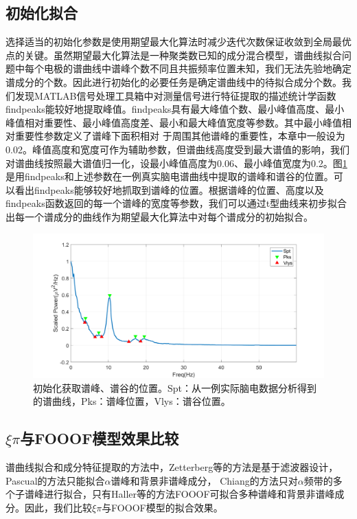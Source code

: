 \subsection{初始化拟合}
选择适当的初始化参数是使用期望最大化算法时减少迭代次数保证收敛到全局最优点的关键。虽然期望最大化算法是一种聚类数已知的成分混合模型，谱曲线拟合问题中每个电极的谱曲线中谱峰个数不同且共振频率位置未知，我们无法先验地确定谱成分的个数。因此进行初始化的必要任务是确定谱曲线中的待拟合成分个数。我们发现MATLAB信号处理工具箱中对测量信号进行特征提取的描述统计学函数findpeaks能较好地提取峰值。findpeaks具有最大峰值个数、最小峰值高度、最小峰值相对重要性、最小峰值高度差、最小和最大峰值宽度等参数。其中最小峰值相对重要性参数定义了谱峰下面积相对
于周围其他谱峰的重要性，本章中一般设为0.02。峰值高度和宽度可作为辅助参数，但谱曲线高度受到最大谱值的影响，我们对谱曲线按照最大谱值归一化，设最小峰值高度为0.06、最小峰值宽度为0.2。图\ref{detect}是用findpeaks和上述参数在一例真实脑电谱曲线中提取的谱峰和谱谷的位置。可以看出findpeaks能够较好地抓取到谱峰的位置。根据谱峰的位置、高度以及findpeaks函数返回的每一个谱峰的宽度等参数，我们可以通过t型曲线来初步拟合出每一个谱成分的曲线作为期望最大化算法中对每个谱成分的初始拟合。
\begin{figure}[!h]
	\includegraphics[width=15cm]{pic/xipi/detect.png}
	\caption{初始化获取谱峰、谱谷的位置。Spt：从一例实际脑电数据分析得到的谱曲线，Pks：谱峰位置，Vlys：谱谷位置。}
	\label{detect}
\end{figure}

\subsection{$\xi\pi$与FOOOF模型效果比较}
谱曲线拟合和成分特征提取的方法中，Zetterberg等的方法是基于滤波器设计，Pascual的方法只能拟合$\alpha$谱峰和背景非谱峰成分，
Chiang的方法只对$\alpha$频带的多个子谱峰进行拟合，只有Haller等的方法FOOOF可拟合多种谱峰和背景非谱峰成分。因此，我们比较$\xi\pi$与FOOOF模型的拟合效果。

